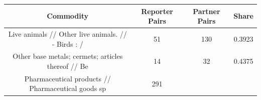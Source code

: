 \documentclass[10pt,]{article}
\begin{document}
\begin{longtable}[]{@{}cccc@{}}
\toprule
\begin{minipage}[b]{0.38\columnwidth}\centering\strut
Commodity\strut
\end{minipage} & \begin{minipage}[b]{0.21\columnwidth}\centering\strut
Reporter Pairs\strut
\end{minipage} & \begin{minipage}[b]{0.20\columnwidth}\centering\strut
Partner Pairs\strut
\end{minipage} & \begin{minipage}[b]{0.09\columnwidth}\centering\strut
Share\strut
\end{minipage}\tabularnewline
\midrule
\endhead
\begin{minipage}[t]{0.38\columnwidth}\centering\strut
Live animals // Other live animals. // - Birds : /\strut
\end{minipage} & \begin{minipage}[t]{0.21\columnwidth}\centering\strut
51\strut
\end{minipage} & \begin{minipage}[t]{0.20\columnwidth}\centering\strut
130\strut
\end{minipage} & \begin{minipage}[t]{0.09\columnwidth}\centering\strut
0.3923\strut
\end{minipage}\tabularnewline
\begin{minipage}[t]{0.38\columnwidth}\centering\strut
Other base metals; cermets; articles thereof // Be\strut
\end{minipage} & \begin{minipage}[t]{0.21\columnwidth}\centering\strut
14\strut
\end{minipage} & \begin{minipage}[t]{0.20\columnwidth}\centering\strut
32\strut
\end{minipage} & \begin{minipage}[t]{0.09\columnwidth}\centering\strut
0.4375\strut
\end{minipage}\tabularnewline
\begin{minipage}[t]{0.38\columnwidth}\centering\strut
Pharmaceutical products // Pharmaceutical goods sp\strut
\end{minipage} & \begin{minipage}[t]{0.21\columnwidth}\centering\strut
291\strut
\end{minipage} & \begin{minipage}[t]{0.20\columnwidth}\centering\strut

\end{minipage}
\end{longtable}
\end{document}
